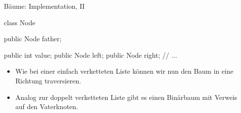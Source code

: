 \begin{frame}[fragile]{Bäume: Implementation, II}
    \pause\begin{minipage}{.4\linewidth}
\small%
\begin{plainjava}
class Node {
    public Node father;

    public int value;
    public Node left;
    public Node right;
    // ...
}
\end{plainjava}
    \end{minipage}\hfill{}\pause\begin{minipage}{.55\linewidth}%
\centering{}
\end{minipage}\vfill
    \begin{itemize}[<+(1)->]
        \widei
        \item Wie bei einer einfach verketteten Liste können wir nun den Baum in eine Richtung traversieren.
        \item Analog zur doppelt verketteten Liste gibt es einen Binärbaum mit Verweis auf den Vaterknoten.
    \end{itemize}
\end{frame}

